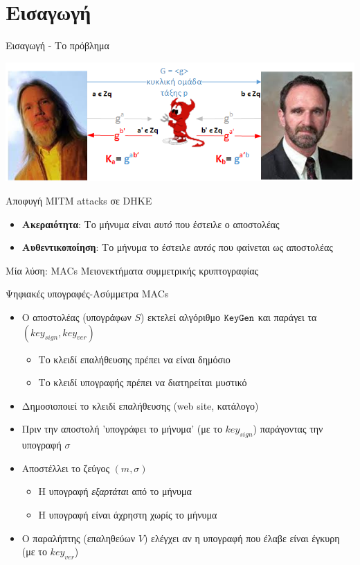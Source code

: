 \documentclass[handout]{beamer}
\begin{document}
\section{Εισαγωγή}
\begin{frame}{Εισαγωγή - Το πρόβλημα}
\begin{center}
\includegraphics[scale=0.5]{dh-mitm.png}
\end{center}
\pause
Αποφυγή MITM attacks σε DHKE
\begin{itemize}
\item \textbf{Ακεραιότητα}: Το μήνυμα είναι \emph{αυτό} που έστειλε ο αποστολέας
\item \textbf{Αυθεντικοποίηση}: Το μήνυμα το έστειλε \emph{αυτός} που φαίνεται ως αποστολέας
\end{itemize}
\pause
Μία λύση: MACs
\alert{Μειονεκτήματα συμμετρικής κρυπτογραφίας}
\end{frame}

\begin{frame}{Ψηφιακές υπογραφές-Ασύμμετρα MACs}
\begin{itemize}
\item Ο αποστολέας (υπογράφων $S$) εκτελεί αλγόριθμο $\mathtt{KeyGen}$ και παράγει τα $(key_{sign},key_{ver})$
\begin{itemize}
\item Το κλειδί επαλήθευσης πρέπει να είναι δημόσιο\\
\item Το κλειδί υπογραφής πρέπει να διατηρείται μυστικό\\
\end{itemize}
\item Δημοσιοποιεί το κλειδί επαλήθευσης (web site, κατάλογο)
\pause
\item Πριν την αποστολή 'υπογράφει το μήνυμα' (με το $key_{sign}$) παράγοντας την υπογραφή $\sigma$
\pause
\item Αποστέλλει το ζεύγος $(m,\sigma)$
\begin{itemize}
\item Η υπογραφή \emph{εξαρτάται} από το μήνυμα
\item Η υπογραφή είναι άχρηστη χωρίς το μήνυμα
\end{itemize}
\pause
\item Ο παραλήπτης (επαληθεύων $V$) ελέγχει αν η υπογραφή που έλαβε είναι έγκυρη (με το $key_{ver}$)
\end{itemize}
\end{frame}
\end{document}
